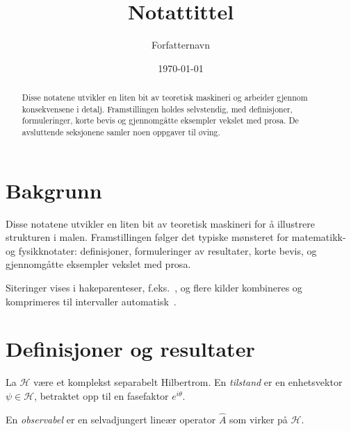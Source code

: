 \documentclass[a4paper,11pt]{article}
\title{Notattittel}
\author{Forfatternavn}
\date{\today}
\begin{document}
\maketitle

\begin{abstract}
Disse notatene utvikler en liten bit av teoretisk maskineri og arbeider gjennom konsekvensene i detalj. Framstillingen holdes selvstendig, med definisjoner, formuleringer, korte bevis og gjennomgåtte eksempler vekslet med prosa. De avsluttende seksjonene samler noen oppgaver til øving.
\end{abstract}

\clearpage
\framedtoc
\clearpage


\section{Bakgrunn}

Disse notatene utvikler en liten bit av teoretisk maskineri for å illustrere strukturen i malen. Framstillingen følger det typiske mønsteret for matematikk- og fysikknotater: definisjoner, formuleringer av resultater, korte bevis, og gjennomgåtte eksempler vekslet med prosa.

Siteringer vises i hakeparenteser, f.eks.\ \cite{eksempel-artikkel}, og flere kilder kombineres og komprimeres til intervaller automatisk~\cite{eksempel-artikkel,eksempel-bok}.


\section{Definisjoner og resultater}

\begin{viktig}
\begin{definisjon}
  La $\mathcal{H}$ være et komplekst separabelt Hilbertrom. En \emph{tilstand} er en enhetsvektor $\psi \in \mathcal{H}$, betraktet opp til en fasefaktor $e^{i\theta}$.
\end{definisjon}
\end{viktig}

\begin{definisjon}
  En \emph{observabel} er en selvadjungert lineær operator $\hat{A}$ som virker på $\mathcal{H}$.
\end{definisjon}
\end{document}
